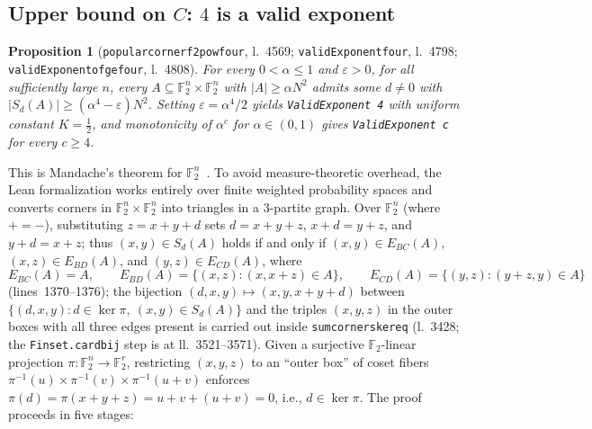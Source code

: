 \documentclass[11pt,reqno]{amsart}
\newtheorem{proposition}[theorem]{Proposition}
\theoremstyle{remark}
\newcommand{\F}{\mathbb{F}}
\newcommand{\LeanUS}{\textunderscore\hspace{0pt}}
\newcommand{\lean}[1]{{\let\_\LeanUS\texttt{#1}}}
\begin{document}
\subsection{Upper bound on \texorpdfstring{$C$}{C}: \texorpdfstring{$4$}{4} is a valid exponent}

\begin{proposition}[\lean{popular\_corner\_f2\_pow\_four}, l.~4569; \lean{validExponent\_four}, l.~4798; \lean{validExponent\_\allowbreak of\_ge\_four}, l.~4808]\label{prop:upper}
For every $0 < \alpha \le 1$ and $\varepsilon > 0$, for all sufficiently large $n$, every $A \subseteq \F_2^n \times \F_2^n$ with $|A| \ge \alpha N^2$ admits some $d \neq 0$ with $|S_d(A)| \ge (\alpha^4 - \varepsilon) N^2$. Setting $\varepsilon = \alpha^4 / 2$ yields \lean{ValidExponent 4} with uniform constant $K = \tfrac{1}{2}$, and monotonicity of $\alpha^c$ for $\alpha \in (0, 1)$ gives \lean{ValidExponent c} for every $c \ge 4$.
\end{proposition}

This is Mandache's theorem for $\F_2^n$~\cite{Mandache}. To avoid measure-theoretic overhead, the Lean formalization works entirely over finite weighted probability spaces and converts corners in $\F_2^n \times \F_2^n$ into triangles in a $3$-partite graph. Over $\F_2^n$ (where $+ = -$), substituting $z = x + y + d$ sets $d = x + y + z$, $x + d = y + z$, and $y + d = x + z$; thus $(x, y) \in S_d(A)$ holds if and only if $(x, y) \in E_{BC}(A)$, $(x, z) \in E_{BD}(A)$, and $(y, z) \in E_{CD}(A)$, where
\[
  E_{BC}(A) = A, \qquad
  E_{BD}(A) = \{(x, z) : (x, x + z) \in A\}, \qquad
  E_{CD}(A) = \{(y, z) : (y + z, y) \in A\}
\]
(lines~1370--1376); the bijection $(d, x, y) \mapsto (x, y, x + y + d)$ between $\{(d, x, y) : d \in \ker \pi,\ (x, y) \in S_d(A)\}$ and the triples $(x, y, z)$ in the outer boxes with all three edges present is carried out inside \lean{sum\_corners\_ker\_eq} (l.~3428; the \lean{Finset.\allowbreak{}card\_bij} step is at ll.~3521--3571). Given a surjective $\F_2$-linear projection $\pi : \F_2^n \to \F_2^r$, restricting $(x, y, z)$ to an ``outer box'' of coset fibers $\pi^{-1}(u) \times \pi^{-1}(v) \times \pi^{-1}(u + v)$ enforces $\pi(d) = \pi(x + y + z) = u + v + (u + v) = 0$, i.e., $d \in \ker \pi$. The proof proceeds in five stages:
\end{document}
